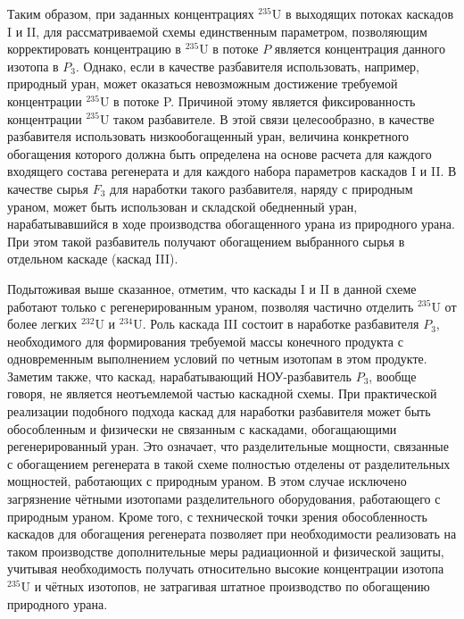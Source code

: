 Таким образом, при заданных концентрациях $^{235}$U в выходящих потоках каскадов I и II, для рассматриваемой схемы единственным параметром, позволяющим корректировать концентрацию в $^{235}$U в потоке $P$ является концентрация данного изотопа в $P_{3}$. Однако, если в качестве разбавителя использовать, например, природный уран, может оказаться невозможным достижение требуемой концентрации $^{235}$U в потоке P. Причиной этому является фиксированность концентрации $^{235}$U таком разбавителе. В этой связи целесообразно, в качестве разбавителя использовать низкообогащенный уран, величина конкретного обогащения которого должна быть определена на основе расчета для каждого входящего состава регенерата и для каждого набора параметров каскадов I и II. В качестве сырья $F_3$ для наработки такого разбавителя, наряду с природным ураном, может быть использован и складской обедненный уран, нарабатывавшийся в ходе производства обогащенного урана из природного урана. При этом такой разбавитель получают обогащением выбранного сырья в отдельном каскаде (каскад III).

Подытоживая выше сказанное, отметим, что каскады I и II в данной схеме работают только с регенерированным ураном, позволяя частично отделить $^{235}$U от более легких $^{232}$U и $^{234}$U. Роль каскада III состоит в наработке разбавителя $P_{3}$, необходимого для формирования требуемой массы конечного продукта с одновременным выполнением условий по четным изотопам в этом продукте. Заметим также, что каскад, нарабатывающий НОУ-разбавитель $P_{3}$, вообще говоря, не является неотъемлемой частью каскадной схемы. При практической реализации подобного подхода каскад для наработки разбавителя может быть обособленным и физически не связанным с каскадами, обогащающими регенерированный уран. Это означает, что разделительные мощности, связанные с обогащением регенерата в такой схеме полностью отделены от разделительных мощностей, работающих с природным ураном. В этом случае исключено загрязнение чётными изотопами разделительного оборудования, работающего с природным ураном. Кроме того, с технической точки зрения обособленность каскадов для обогащения регенерата позволяет при необходимости реализовать на таком производстве дополнительные меры радиационной и физической защиты, учитывая необходимость получать относительно высокие концентрации изотопа $^{235}$U и чётных изотопов, не затрагивая штатное производство по обогащению природного урана.


